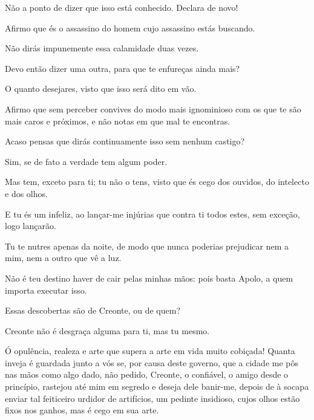    Não a ponto de dizer que isso está conhecido. Declara de novo!

   Afirmo que és o assassino do homem cujo assassino estás buscando.

   Não dirás impunemente essa calamidade duas vezes.

   Devo então dizer uma outra, para que te enfureças ainda mais?

   O quanto desejares, visto que isso será dito em vão.

   Afirmo que sem perceber convives do modo mais ignominioso com os que te
são mais caros e próximos, e não notas em que mal te encontras.

   Acaso pensas que dirás continuamente isso sem nenhum castigo?

   Sim, se de fato a verdade tem algum poder.

   Mas tem, exceto para ti;  tu não o tens, visto que és cego dos
ouvidos, do intelecto e dos olhos.

   E tu és um infeliz, ao lançar-me injúrias que contra ti todos estes, sem
exceção, logo lançarão.

   Tu te nutres apenas da noite, de modo que nunca poderias prejudicar nem
a mim, nem a outro que vê a luz.

   Não é teu destino haver de cair pelas minhas mãos: pois basta Apolo, a
quem importa executar isso.

   Essas descobertas são de Creonte, ou de quem?

   Creonte não é desgraça alguma para ti, mas tu mesmo.

   Ó opulência, realeza e arte que supera a arte em vida muito
cobiçada! Quanta inveja é guardada junto a vós se, por causa deste
governo, que a cidade me pôs nas mãos como algo dado, não pedido,
Creonte, o confiável, o amigo desde o princípio, rastejou até mim em
segredo e deseja dele banir-me, depois de à socapa enviar tal feiticeiro
urdidor de artifícios, um pedinte insidioso, cujos olhos estão fixos nos
ganhos, mas é cego em sua arte.

